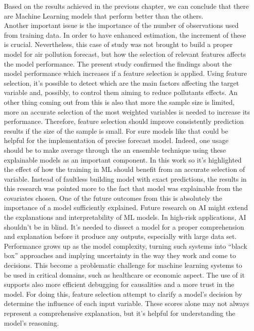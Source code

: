 Based on the results achieved in the previous chapter, we can conclude that there are Machine Learning models that perform better than the others.\\
Another important issue is the importance of the number of observations used from training data. In order to have enhanced estimation, the increment of these is crucial.
Nevertheless, this case of study was not brought to build a proper model for air pollution forecast, but how the selection of relevant features affects the model performance. 
The present study confirmed the findings about the model performance which increases if a feature selection is applied.
Using feature selection, it's possible to detect which are the main factors affecting the target variable and, possibly, to control them aiming to reduce pollutants effects.
An other thing coming out from this is also that more the sample size is limited, more an accurate selection of the most weighted variables is needed to increase its performance.
Therefore, feature selection should improve consistently prediction results if the size of the sample is small.
For sure models like that could be helpful for the implementation of precise forecast model. Indeed, one usage should be to make average through the an ensemble technique using these explainable models as an important component.
\break
In this work so it's highlighted the effect of how the training in ML should benefit from an accurate selection of variable. 
Instead of faultless building model with exact predictions, the results in this research was pointed more to the fact that model was explainable from the covariates chosen. 
One of the future outcomes from this is absolutely the importance of a model sufficiently explained.
Future research on AI might extend the explanations and interpretability of ML models.
In high-risk applications, AI shouldn't be in blind. 
It's needed to dissect a model for a proper comprehension and explanation before it produce any outputs, especially with large data set.
Performance grows up as the model complexity, turning such systems into “black box” approaches and implying uncertainty in
the way they work and come to decisions. This become a problematic challenge for machine learning systems to be used in critical domains, such as healthcare or economic aspect.
The use of it supports also more efficient debugging for  causalities and a more trust in the model.
For doing this, feature selection attempt to clarify a model’s decision by determine the influence of each input variable. 
These scores alone may not always represent a comprehensive explanation, but it's helpful for understanding the model’s reasoning.
